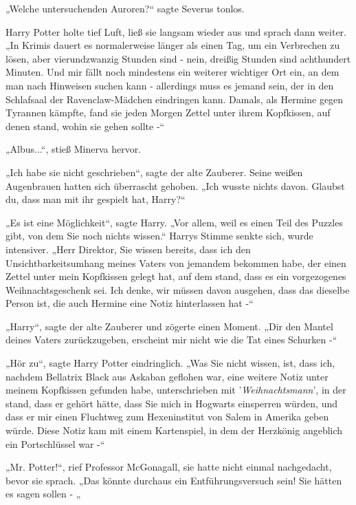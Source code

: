 {„Welche untersuchenden Auroren?“ sagte Severus tonlos.

Harry Potter holte tief Luft, ließ sie langsam wieder aus und sprach dann weiter.\\ „In Krimis dauert es normalerweise länger als einen Tag, um ein Verbrechen zu lösen, aber vierundzwanzig Stunden sind - nein, dreißig Stunden sind achthundert Minuten. Und mir fällt noch mindestens ein weiterer wichtiger Ort ein, an dem man nach Hinweisen suchen kann - allerdings muss es jemand sein, der in den Schlafsaal der Ravenclaw-Mädchen eindringen kann. Damals, als Hermine gegen Tyrannen kämpfte, fand sie jeden Morgen Zettel unter ihrem Kopfkissen, auf denen stand, wohin sie gehen sollte -“

„Albus...“, stieß Minerva hervor.

„Ich habe sie nicht geschrieben“, sagte der alte Zauberer. Seine weißen Augenbrauen hatten sich überrascht gehoben. „Ich wusste nichts davon. Glaubst du, dass man mit ihr gespielt hat, Harry?“

„Es ist eine Möglichkeit“, sagte Harry. „Vor allem, weil es einen Teil des Puzzles gibt, von dem Sie noch nichts wissen.“ Harrys Stimme senkte sich, wurde intensiver. „Herr Direktor, Sie wissen bereits, dass ich den Unsichtbarkeitsumhang meines Vaters von jemandem bekommen habe, der einen Zettel unter mein Kopfkissen gelegt hat, auf dem stand, dass es ein vorgezogenes Weihnachtsgeschenk sei. Ich denke, wir müssen davon ausgehen, dass das dieselbe Person ist, die auch Hermine eine Notiz hinterlassen hat -“

„Harry“, sagte der alte Zauberer und zögerte einen Moment. „Dir den Mantel deines Vaters zurückzugeben, erscheint mir nicht wie die Tat eines Schurken -“

„Hör zu“, sagte Harry Potter eindringlich. „Was Sie nicht wissen, ist, dass ich, nachdem Bellatrix Black aus Askaban geflohen war, eine weitere Notiz unter meinem Kopfkissen gefunden habe, unterschrieben mit '\emph{Weihnachtsmann}', in der stand, dass er gehört hätte, dass Sie mich in Hogwarts einsperren würden, und dass er mir einen Fluchtweg zum Hexeninstitut von Salem in Amerika geben würde. Diese Notiz kam mit einem Kartenspiel, in dem der Herzkönig angeblich ein Portschlüssel war -“

„Mr. Potter!“, rief Professor McGonagall, sie hatte nicht einmal nachgedacht, bevor sie sprach. „Das könnte durchaus ein Entführungsversuch sein! Sie hätten es sagen sollen - „

}
